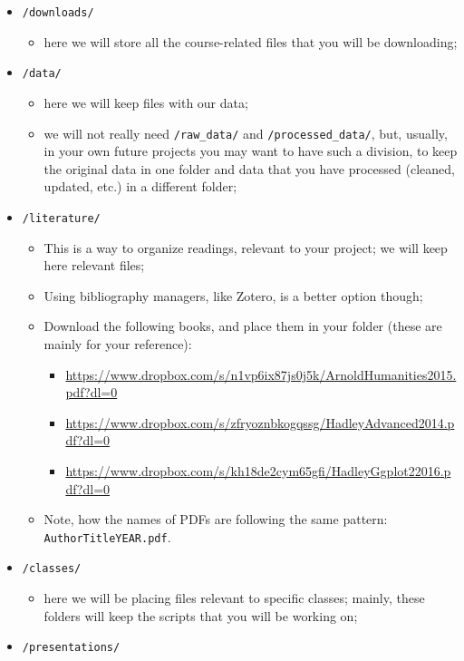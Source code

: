 \documentclass[
]{book}
\providecommand{\tightlist}{%
  \setlength{\itemsep}{0pt}\setlength{\parskip}{0pt}}
\begin{document}
\begin{itemize}
\tightlist
\item
  \texttt{/downloads/}

  \begin{itemize}
  \tightlist
  \item
    here we will store all the course-related files that you will be downloading;
  \end{itemize}
\item
  \texttt{/data/}

  \begin{itemize}
  \tightlist
  \item
    here we will keep files with our data;
  \item
    we will not really need \texttt{/raw\_data/} and \texttt{/processed\_data/}, but, usually, in your own future projects you may want to have such a division, to keep the original data in one folder and data that you have processed (cleaned, updated, etc.) in a different folder;
  \end{itemize}
\item
  \texttt{/literature/}

  \begin{itemize}
  \tightlist
  \item
    This is a way to organize readings, relevant to your project; we will keep here relevant files;
  \item
    Using bibliography managers, like Zotero, is a better option though;
  \item
    Download the following books, and place them in your folder (these are mainly for your reference):

    \begin{itemize}
    \tightlist
    \item
      \url{https://www.dropbox.com/s/n1vp6ix87js0j5k/ArnoldHumanities2015.pdf?dl=0}
    \item
      \url{https://www.dropbox.com/s/zfryoznbkogqssg/HadleyAdvanced2014.pdf?dl=0}
    \item
      \url{https://www.dropbox.com/s/kh18de2cym65gfi/HadleyGgplot22016.pdf?dl=0}
    \end{itemize}
  \item
    Note, how the names of PDFs are following the same pattern: \texttt{AuthorTitleYEAR.pdf}.
  \end{itemize}
\item
  \texttt{/classes/}

  \begin{itemize}
  \tightlist
  \item
    here we will be placing files relevant to specific classes; mainly, these folders will keep the scripts that you will be working on;
  \end{itemize}
\item
  \texttt{/presentations/}


\end{itemize}
\end{document}
